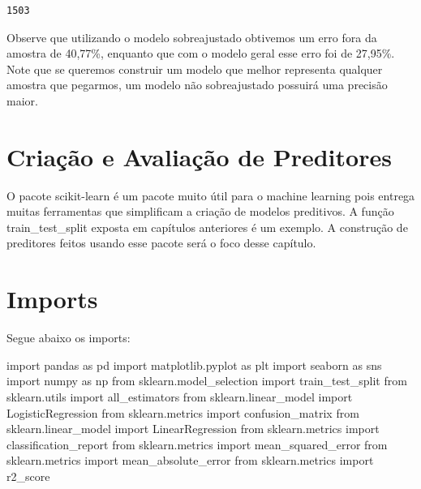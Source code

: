 \documentclass[
  letterpaper,
  DIV=11,
  numbers=noendperiod]{scrreprt}
\newenvironment{Shaded}{\begin{snugshade}}{\end{snugshade}}
\newcommand{\ImportTok}[1]{\textcolor[rgb]{0.00,0.46,0.62}{#1}}
\newcommand{\NormalTok}[1]{\textcolor[rgb]{0.00,0.23,0.31}{#1}}
\begin{document}
\begin{verbatim}
1503
\end{verbatim}

Observe que utilizando o modelo sobreajustado obtivemos um erro fora da
amostra de 40,77\%, enquanto que com o modelo geral esse erro foi de
27,95\%. Note que se queremos construir um modelo que melhor representa
qualquer amostra que pegarmos, um modelo não sobreajustado possuirá uma
precisão maior.


\hypertarget{criauxe7uxe3o-e-avaliauxe7uxe3o-de-preditores}{%
\chapter{Criação e Avaliação de
Preditores}\label{criauxe7uxe3o-e-avaliauxe7uxe3o-de-preditores}}

O pacote scikit-learn é um pacote muito útil para o machine learning
pois entrega muitas ferramentas que simplificam a criação de modelos
preditivos. A função train\_test\_split exposta em capítulos anteriores
é um exemplo. A construção de preditores feitos usando esse pacote será
o foco desse capítulo.


\hypertarget{imports}{%
\chapter{Imports}\label{imports}}

Segue abaixo os imports:

\begin{Shaded}
\begin{Highlighting}[]
\ImportTok{import}\NormalTok{ pandas }\ImportTok{as}\NormalTok{ pd}
\ImportTok{import}\NormalTok{ matplotlib.pyplot }\ImportTok{as}\NormalTok{ plt}
\ImportTok{import}\NormalTok{ seaborn }\ImportTok{as}\NormalTok{ sns}
\ImportTok{import}\NormalTok{ numpy }\ImportTok{as}\NormalTok{ np}
\ImportTok{from}\NormalTok{ sklearn.model\_selection }\ImportTok{import}\NormalTok{ train\_test\_split}
\ImportTok{from}\NormalTok{ sklearn.utils }\ImportTok{import}\NormalTok{ all\_estimators}
\ImportTok{from}\NormalTok{ sklearn.linear\_model }\ImportTok{import}\NormalTok{ LogisticRegression}
\ImportTok{from}\NormalTok{ sklearn.metrics }\ImportTok{import}\NormalTok{ confusion\_matrix}
\ImportTok{from}\NormalTok{ sklearn.linear\_model }\ImportTok{import}\NormalTok{ LinearRegression}
\ImportTok{from}\NormalTok{ sklearn.metrics }\ImportTok{import}\NormalTok{ classification\_report}
\ImportTok{from}\NormalTok{ sklearn.metrics }\ImportTok{import}\NormalTok{ mean\_squared\_error}
\ImportTok{from}\NormalTok{ sklearn.metrics }\ImportTok{import}\NormalTok{ mean\_absolute\_error}
\ImportTok{from}\NormalTok{ sklearn.metrics }\ImportTok{import}\NormalTok{ r2\_score}
\end{Highlighting}
\end{Shaded}
\end{document}
